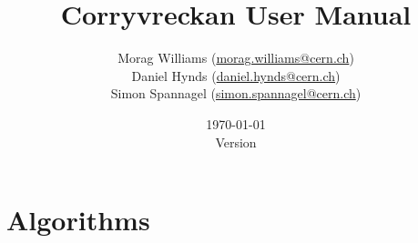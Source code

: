 \documentclass[fontsize=12pt, parskip=half]{scrartcl}
\title{Corryvreckan User Manual} %
\author{Morag Williams (\href{mailto:morag.williams@cern.ch}{morag.williams@cern.ch})\\
  Daniel Hynds (\href{mailto:daniel.hynds@cern.ch}{daniel.hynds@cern.ch})\\
  Simon Spannagel (\href{mailto:simon.spannagel@cern.ch}{simon.spannagel@cern.ch})
} %
\date{\today\\ \vspace{10pt} Version \version} %
\begin{document}
\begin{titlepage}
\maketitle %

\addlicense
\end{titlepage}

\clearpage
\tableofcontents

\clearpage

\section{Algorithms}
\label{sec:algorithms}

\lstset{language=Ini}
\lstset{language=}
\clearpage


\clearpage

\appendix
% 
% 

\clearpage
{}
\addreferencesline
\printbibliography
\end{document}

